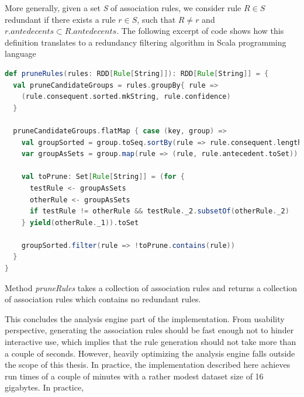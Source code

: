 More generally, given a set \textit{S} of association rules, we consider rule $R \in S$ redundant if there exists a rule $r \in S$, such that $R \neq r$ and $r.antedecents \subset R.antedecents$. The following excerpt of code shows how this definition translates to a redundancy filtering algorithm in Scala programming language
    
    \begin{minipage}{\linewidth}
\begin{lstlisting}[language=scala] 
def pruneRules(rules: RDD[Rule[String]]): RDD[Rule[String]] = {
  val pruneCandidateGroups = rules.groupBy{ rule => 
    (rule.consequent.sorted.mkString, rule.confidence) 
  }

  pruneCandidateGroups.flatMap { case (key, group) =>
    val groupSorted = group.toSeq.sortBy(rule => rule.consequent.length)
    var groupAsSets = group.map(rule => (rule, rule.antecedent.toSet))

    val toPrune: Set[Rule[String]] = (for {
      testRule <- groupAsSets
      otherRule <- groupAsSets
      if testRule != otherRule && testRule._2.subsetOf(otherRule._2)
    } yield(otherRule._1)).toSet
    
    groupSorted.filter(rule => !toPrune.contains(rule))
  }
}
\end{lstlisting}
\end{minipage}       

Method \textit{pruneRules} takes a collection of association rules and returns a collection of association rules which contains no redundant rules.

This concludes the analysis engine part of the implementation. From usability perspective, generating the association rules should be fast enough not to hinder interactive use, which implies that the rule generation should not take more than a couple of seconds. However, heavily optimizing the analysis engine falls outside the scope of this thesis. In practice, the implementation described here achieves run times of a couple of minutes with a rather modest dataset size of 16 gigabytes. In practice, 


   